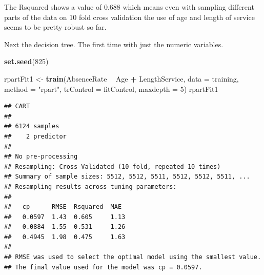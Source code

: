 \documentclass[12pt, krantz2,]{krantz}
\makeatletter
\newenvironment{Shaded}{\begin{snugshade}}{\end{snugshade}}
\newcommand{\CommentTok}[1]{\textcolor[rgb]{0.37,0.37,0.37}{\textit{#1}}}
\newcommand{\DataTypeTok}[1]{\textcolor[rgb]{0.27,0.27,0.27}{#1}}
\newcommand{\DecValTok}[1]{\textcolor[rgb]{0.06,0.06,0.06}{#1}}
\newcommand{\KeywordTok}[1]{\textcolor[rgb]{0.27,0.27,0.27}{\textbf{#1}}}
\newcommand{\NormalTok}[1]{#1}
\newcommand{\OperatorTok}[1]{\textcolor[rgb]{0.43,0.43,0.43}{\textbf{#1}}}
\newcommand{\StringTok}[1]{\textcolor[rgb]{0.5,0.5,0.5}{#1}}
\newenvironment{kframe}{%
\medskip{}
\setlength{\fboxsep}{.8em}
 \def\at@end@of@kframe{}%
 \ifinner\ifhmode%
  \def\at@end@of@kframe{\end{minipage}}%
  \begin{minipage}{\columnwidth}%
 \fi\fi%
 \def\FrameCommand##1{\hskip\@totalleftmargin \hskip-\fboxsep
 \colorbox{shadecolor}{##1}\hskip-\fboxsep
     \hskip-\linewidth \hskip-\@totalleftmargin \hskip\columnwidth}%
 \MakeFramed {\advance\hsize-\width
   \@totalleftmargin\z@ \linewidth\hsize
   \@setminipage}}%
 {\par\unskip\endMakeFramed%
 \at@end@of@kframe}
\renewenvironment{Shaded}{\begin{kframe}}{\end{kframe}}
\makeatother
\begin{document}
\begin{Shaded}
\end{Shaded}

The Rsquared shows a value of 0.688 which means even with sampling different parts of the data on 10 fold cross validation the use of age and length of service seems to be pretty robust so far.

Next the decision tree. The first time with just the numeric variables.

\begin{Shaded}
\begin{Highlighting}[]
\KeywordTok{set.seed}\NormalTok{(}\DecValTok{825}\NormalTok{)}

\NormalTok{rpartFit1 <-}\StringTok{ }\KeywordTok{train}\NormalTok{(AbsenceRate }\OperatorTok{~}\StringTok{ }\NormalTok{Age }\OperatorTok{+}\StringTok{ }\NormalTok{LengthService, }\DataTypeTok{data =}\NormalTok{ training,}
                 \DataTypeTok{method =} \StringTok{"rpart"}\NormalTok{,}
                 \DataTypeTok{trControl =}\NormalTok{ fitControl,}
                 \DataTypeTok{maxdepth =} \DecValTok{5}\NormalTok{)}
\NormalTok{rpartFit1}
\end{Highlighting}
\end{Shaded}

\begin{verbatim}
## CART 
## 
## 6124 samples
##    2 predictor
## 
## No pre-processing
## Resampling: Cross-Validated (10 fold, repeated 10 times) 
## Summary of sample sizes: 5512, 5512, 5511, 5512, 5512, 5511, ... 
## Resampling results across tuning parameters:
## 
##   cp      RMSE  Rsquared  MAE 
##   0.0597  1.43  0.605     1.13
##   0.0884  1.55  0.531     1.26
##   0.4945  1.98  0.475     1.63
## 
## RMSE was used to select the optimal model using the smallest value.
## The final value used for the model was cp = 0.0597.
\end{verbatim}
\end{document}
